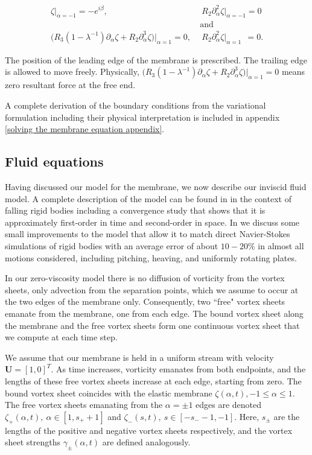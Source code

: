 \documentclass{article}[12pt]
\theoremstyle{Theorem}
\begin{document}
\begin{align}
    \zeta|_{\alpha=-1}= -e^{i\beta}, \ &\ R_2\partial_\alpha^2\zeta\big|_{\alpha =-1} = 0 \\ &\text{and} \nonumber \\
    \big(R_3(1-\lambda^{-1})\partial_\alpha\zeta +R_2\partial_\alpha^3\zeta\big) \big|_{\alpha = 1}= 0,\ &\ R_2\partial_\alpha^2\zeta\big|_{\alpha =1}\ \  = 0.
\end{align}

The position of the leading edge of the membrane is prescribed. The trailing edge is allowed to move freely. Physically, $\big(R_3(1-\lambda^{-1})\partial_\alpha\zeta +R_2\partial_\alpha^3\zeta\big) \big|_{\alpha = 1}= 0$ means zero resultant force at the free end.
\newline

A complete derivation of the boundary conditions from the variational formulation including their physical interpretation is included in appendix \ref{solving the membrane equation appendix}.

\subsection{Fluid equations}
\label{fluid equations section}
Having discussed our model for the membrane, we now describe our inviscid fluid model. A complete description of the model can be found in \cite{loo2025falling} in the context of falling rigid bodies including a convergence study that shows that it is approximately first-order in time and second-order in space. In \cite{loo2026comparisoninviscidviscousvortex} we discuss some small improvements to the model that allow it to match direct Navier-Stokes simulations of rigid bodies with an average error of about $10-20\%$ in almost all motions considered, including pitching, heaving, and uniformly rotating plates. 
\newline

In our zero-viscosity model there is no diffusion of vorticity from the vortex sheets, only advection from the separation points, which we assume to occur at the two edges of the membrane only.  Consequently, two ``free" vortex sheets emanate from the membrane, one from each edge. The bound vortex sheet along the membrane and the free vortex sheets form one continuous vortex sheet that we compute at each time step. 
\newline

We assume that our membrane is held in a uniform stream with velocity $\boldsymbol{U}= [1,0]^T$. As time increases, vorticity emanates from both endpoints, and the lengths of these free vortex sheets increase at each edge, starting from zero. The bound vortex sheet coincides with the elastic membrane $\zeta(\alpha, t), -1 \leq \alpha \leq 1$. The free vortex sheets emanating from the $\alpha = \pm 1$ edges are denoted $\zeta_{+}(\alpha, t),\ \alpha\in [1,s_{+} + 1]$ and $\zeta_{-}(s,t),\ s \in [-s_{-} -1,-1]$. Here, $s_{\pm}$ are the lengths of the positive and negative vortex sheets respectively, and the vortex sheet strengths $\gamma_{\pm}(\alpha, t)$ are defined analogously.
\newline
\end{document}
